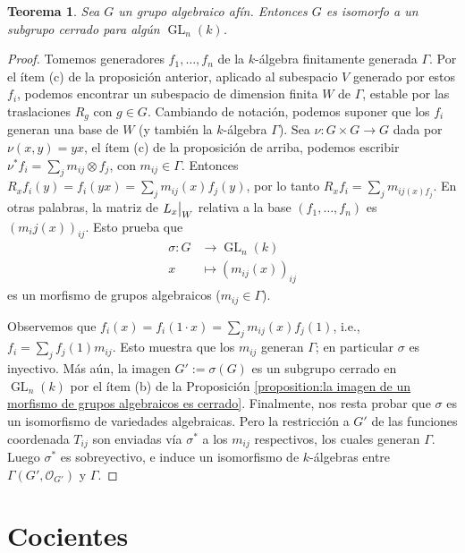 \documentclass[spanish,10pt]{amsart}
\newtheorem{theorem}{Teorema}[section]
\theoremstyle{definition}
\theoremstyle{remark}
\numberwithin{equation}{section}
\newcommand\rest[2]{{%
  \left.\kern-\nulldelimiterspace %
  #1 %
  \vphantom{\big|} %
  \right|_{#2} %
  }}
\renewcommand{\O}{\mathcal{O}}
\begin{document}
\begin{theorem}\label{th:todo grupo algebraico afin es isomorfo a un subgrupo cerrado de GLn}
Sea $G$ un grupo algebraico afín. Entonces $G$ es isomorfo a un subgrupo cerrado para algún $\operatorname{GL}_n (k)$.
\end{theorem}
\begin{proof}
Tomemos generadores $f_1, \ldots, f_n$ de la $k$-álgebra finitamente generada $\Gamma$. Por el ítem (c) de la proposición anterior, aplicado al subespacio $V$ generado por estos $f_i$, podemos encontrar un subespacio de dimension finita $W$ de $\Gamma$, estable por las traslaciones $R_g$ con $g \in G$. Cambiando de notación, podemos suponer que los $f_i$ generan una base de $W$ (y también la $k$-álgebra $\Gamma$). Sea $\nu : G \times G \to G$ dada por $\nu (x,y) = yx$, el ítem (c) de la proposición de arriba, podemos escribir $\nu^* f_i = \sum_{j} m_{ij} \otimes f_j$, con $m_{ij} \in \Gamma$. Entonces $R_x f_i (y) = f_i (y x) = \sum_j m_{ij} (x) f_j (y)$, por lo tanto $R_x f_i = \sum_j m_{ij (x) f_j}$. En otras palabras, la matriz de $\rest{L_x} W$ relativa a la base $(f_1, \ldots,f_n)$ es $(m_ij (x))_{ij}$. Esto prueba que
\begin{align*}
    \sigma : G &\longrightarrow \operatorname{GL}_n (k) \\
    x &\longmapsto (m_{ij} (x))_{ij}
\end{align*}
es un morfismo de grupos algebraicos ($m_{ij} \in \Gamma$).

Observemos que $f_i (x) = f_i (1 \cdot x) = \sum_{j} m_{ij} (x) f_j (1)$, i.e., $f_i = \sum_j f_j (1) m_{ij}$. Esto muestra que los $m_{ij}$ generan $\Gamma$; en particular $\sigma$ es inyectivo. Más aún, la imagen $G' := \sigma (G)$ es un subgrupo cerrado en $\operatorname{GL}_n (k)$ por el ítem (b) de la Proposición \ref{proposition:la imagen de un morfismo de grupos algebraicos es cerrado}. Finalmente, nos resta probar que $\sigma$ es un isomorfismo de variedades algebraicas. Pero la restricción a $G'$ de las funciones coordenada $T_{ij}$ son enviadas vía $\sigma^*$ a los $m_{ij}$ respectivos, los cuales generan $\Gamma$. Luego $\sigma^*$ es sobreyectivo, e induce un isomorfismo de $k$-álgebras entre $\Gamma (G', \O_{G'})$ y $\Gamma$.
\end{proof}


\section{Cocientes}
\end{document}
